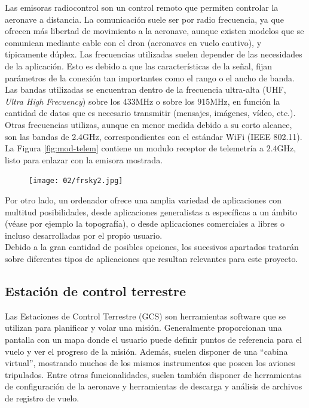 \documentclass[../main.tex]{subfiles}
\begin{document}
Las emisoras radiocontrol son un control remoto que permiten controlar la aeronave a distancia. La comunicación suele ser por radio frecuencia, ya que ofrecen más libertad de movimiento a la aeronave, aunque existen modelos que se comunican mediante cable con el dron (aeronaves en vuelo cautivo), y típicamente dúplex.
Las frecuencias utilizadas suelen depender de las necesidades de la aplicación. Esto es debido a que las características de la señal, fijan parámetros de la conexión tan importantes como el rango o el ancho de banda. Las bandas utilizadas se encuentran dentro de la frecuencia ultra-alta (UHF, \emph{Ultra High Frecuency}) sobre los 433MHz o sobre los 915MHz, en función la cantidad de datos que es necesario transmitir (mensajes, imágenes, vídeo, etc.). Otras frecuencias utilizas, aunque en menor medida debido a su corto alcance, son las bandas de 2.4GHz, correspondientes con el estándar WiFi (IEEE 802.11). La Figura \ref{fig:mod-telem} contiene un modulo receptor de telemetría a $2.4$GHz, listo para enlazar con la emisora mostrada.

\begin{figure}[ht]
 	{\texttt{[image: 02/frsky2.jpg]}}
\end{figure}

Por otro lado, un ordenador ofrece una amplia variedad de aplicaciones con multitud posibilidades, desde aplicaciones generalistas a específicas a un ámbito (véase por ejemplo la topografía), o desde aplicaciones comerciales a libres o incluso desarrolladas por el propio usuario. \\
Debido a la gran cantidad de posibles opciones, los sucesivos apartados tratarán sobre diferentes tipos de aplicaciones que resultan relevantes para este proyecto.

\subsection{Estación de control terrestre} \label{section:herram-gcs}
Las Estaciones de Control Terrestre (GCS) son herramientas software que se utilizan para planificar y volar una misión. Generalmente proporcionan una pantalla con un mapa donde el usuario puede definir puntos de referencia para el vuelo y ver el progreso de la misión. Además, suelen disponer de una ``cabina virtual'', mostrando muchos de los mismos instrumentos que poseen los aviones tripulados.
Entre otras funcionalidades, suelen también disponer de herramientas de configuración de la aeronave y herramientas de descarga y análisis de archivos de registro de vuelo.
\end{document}
